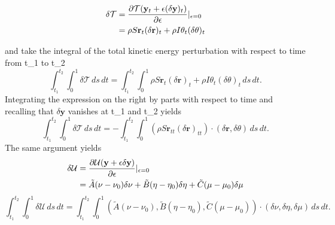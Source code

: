 \documentclass[12pt]{article}
\begin{document}
\begin{equation}
\begin{split}
 \delta\mathcal{T}& = \frac{\partial \mathcal{T}(\mathbf{y}_t + \epsilon (\delta \mathbf{y})_t )}{\partial{\epsilon}} \arrowvert_{\epsilon=0}\\
                  & = \rho S\mathbf{r}_t (\delta\mathbf{r})_t + \rho I \theta_t (\delta \theta)_t\\
\end{split}
\end{equation}

and take the integral of the total kinetic energy perturbation with respect to time from t_1 to t_2
\[\int_{t_1}^{t_2} \int_{0}^{1} \delta \mathcal{T}\, ds \, dt = \int_{t_1}^{t_2} \int_{0}^{1} \rho S\mathbf{r}_t (\delta\mathbf{r})_t + \rho I \theta_t (\delta \theta)_t\, ds \, dt.
\]
Integrating the expression on the right by parts with respect to time and recalling that $\delta\mathbf{y}$ vanishes at t_1 and t_2  yields
\[\int_{t_1}^{t_2}\int_{0}^{1}\delta \mathcal{T}\,ds\,dt = -\int_{t_1}^{t_2}\int_{0}^{1}(\rho S\mathbf{r}_{tt}(\delta\mathbf{r})_{tt})\cdot(\delta\mathbf{r},\delta\theta)\,ds\,dt.
\]
The same argument yields
\begin{equation}
\begin{split}
 \delta\mathcal{U}& = \frac{\partial \mathcal{U}(\mathbf{y} + \epsilon\delta\mathbf{y})}{\partial{\epsilon}} \arrowvert_{\epsilon=0}\\
                  & = \tilde{A}(\nu-\nu_{0})\delta\nu+\tilde{B}(\eta-\eta_0)\delta\eta+\tilde{C}(\mu-\mu_0)\delta\mu\\
\end{split}
\end{equation}
\[\int_{t_1}^{t_2}\int_{0}^{1}\delta\mathcal{U}\,ds\,dt = \int_{t_1}^{t_2} \int_{0}^{1} 
(\tilde{A}(\nu-\nu_{0}),\tilde{B}(\eta-\eta_0),\tilde{C}(\mu-\mu_0))\cdot(\delta\nu,\delta\eta,\delta\mu)\,ds\,dt.
\]
\end{document}
